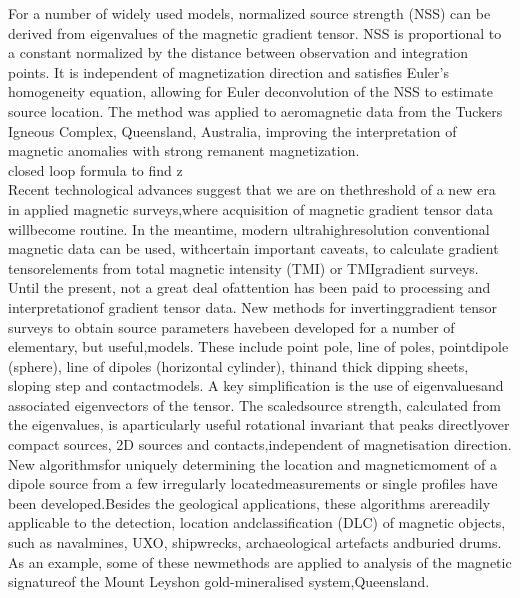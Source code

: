 \cite{NSS_analysis}
For a number of widely used models, normalized source strength (NSS) can be derived from eigenvalues of the magnetic gradient tensor. NSS is proportional to a constant normalized by the distance between observation and integration points. It is independent of magnetization direction and satisfies Euler’s homogeneity equation, allowing for Euler deconvolution of the NSS to estimate source location. The method was applied to aeromagnetic data from the Tuckers Igneous Complex, Queensland, Australia, improving the interpretation of magnetic anomalies with strong remanent magnetization.
 \\

 \cite{not_import_formula_z}
 closed loop formula to find z 
 \\

 \cite{NSS_analysis2}
 Recent technological advances suggest that we are on thethreshold of a new era in applied magnetic surveys,where acquisition of magnetic gradient tensor data willbecome routine. In the meantime, modern ultrahighresolution conventional magnetic data can be used, withcertain important caveats, to calculate gradient tensorelements from total magnetic intensity (TMI) or TMIgradient surveys. Until the present, not a great deal ofattention has been paid to processing and interpretationof gradient tensor data. New methods for invertinggradient tensor surveys to obtain source parameters havebeen developed for a number of elementary, but useful,models. These include point pole, line of poles, pointdipole (sphere), line of dipoles (horizontal cylinder), thinand thick dipping sheets, sloping step and contactmodels. A key simplification is the use of eigenvaluesand associated eigenvectors of the tensor. The scaledsource strength, calculated from the eigenvalues, is aparticularly useful rotational invariant that peaks directlyover compact sources, 2D sources and contacts,independent of magnetisation direction. New algorithmsfor uniquely determining the location and magneticmoment of a dipole source from a few irregularly locatedmeasurements or single profiles have been developed.Besides the geological applications, these algorithms arereadily applicable to the detection, location andclassification (DLC) of magnetic objects, such as navalmines, UXO, shipwrecks, archaeological artefacts andburied drums. As an example, some of these newmethods are applied to analysis of the magnetic signatureof the Mount Leyshon gold-mineralised system,Queensland.
 \\

